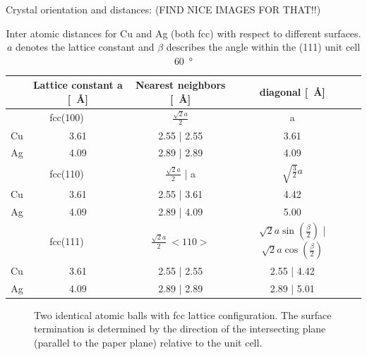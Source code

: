 Crystal orientation and distances: (FIND NICE IMAGES FOR THAT!!)
\begin{table}
\centering
\caption{Inter atomic distances for Cu and Ag (both fcc) with respect to different surfaces. $a$ denotes the lattice constant and $\beta$ describes the angle within the (111) unit cell \SI{60}{\degree}}
  \begin{tabular}{ccccc}
& Lattice constant a [\SI{}{\angstrom}] & Nearest neighbors [\SI{}{\angstrom}] & diagonal [\SI{}{\angstrom}]\\ \hline \hline
\multicolumn{2}{c}{fcc(100)} & $\frac{\sqrt{2}a}{2}$ & a \\
  Cu	 	& 3.61	& 2.55 | 2.55 & 3.61  \\
  Ag		& 4.09	& 2.89 | 2.89 & 4.09 \\ \hline 
\multicolumn{2}{c}{fcc(110)} & $\frac{\sqrt{2}a}{2}$ | a & $\sqrt{\frac{3}{2}}a$\\
  Cu	 	& 3.61	& 2.55 | 3.61	& 4.42 \\
  Ag		& 4.09	& 2.89 | 4.09	& 5.00 \\ \hline 
\multicolumn{2}{c}{fcc(111)} & $\frac{\sqrt{2}a}{2} \ <110>$ & $\sqrt{2}a\sin(\frac{\beta}{2})$ | $\sqrt{2}a\cos(\frac{\beta}{2})$\\
  Cu 		& 3.61	& 2.55 | 2.55	& 2.55 | 4.42 \\
  Ag		& 4.09	& 2.89 | 2.89	& 2.89 | 5.01 \\ \hline
 \end{tabular}
\end{table}

\begin{figure}\centering
	\caption{Two identical atomic balls with fcc lattice configuration. The surface termination is determined by the direction of the intersecting plane (parallel to the paper plane) relative to the unit cell.}
	\label{fig:crystal-termination}
\end{figure}

